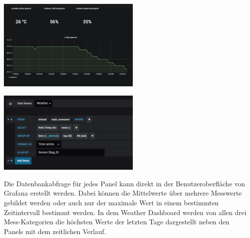 \documentclass[
  12pt, %
  a4paper, %
  twoside, %
  openany, %
  numbers=noenddot, %
  BCOR=5mm, %
  parskip=half*, %
  thesis, %
]{bfhbook}
\begin{document}
\begin{center}
    \begin{minipage}[t]{0.45\textwidth}
        \centering
        \includegraphics[width=7cm]{Bilder/Grafana-Luft.PNG} %
        \captionsetup{justification=centering}
        
        \includegraphics[width=7cm]{Bilder/Grafana-Panel-Konfiguration.PNG}
    \end{minipage}
    \begin{minipage}[t]{0.45\textwidth}
Die Datenbankabfrage für jedes Panel kann direkt in der Benutzeroberfläche von Grafana erstellt werden. Dabei können die Mittelwerte über mehrere Messwerte gebildet werden oder auch nur der maximale Wert in einem bestimmten Zeitintervall bestimmt werden. In dem Weather Dashboard werden von allen drei Mess-Kategorien die höchsten Werte der letzten Tage dargestellt neben den Panels mit dem zeitlichen Verlauf.
    \end{minipage}
\end{center}
\end{document}
